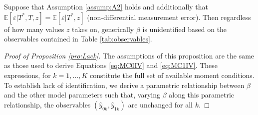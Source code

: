 \begin{pro}
  \label{pro:Lack}
  Suppose that Assumption \ref{assump:A2} holds and additionally that $\mathbb{E}[\varepsilon|T^*,T,z]=\mathbb{E}[\varepsilon|T^*,z]$ (non-differential measurement error).  
  Then regardless of how many values $z$ takes on, generically $\beta$ is unidentified based on the observables contained in Table \ref{tab:observables}.
\end{pro}
\begin{proof}[Proof of Proposition \ref{pro:Lack}]
  The assumptions of this proposition are the same as those used to derive Equations \ref{eq:MC0IV} and \ref{eq:MC1IV}. 
  These expressions, for $k = 1, \dots, K$ constitute the full set of available moment conditions.
  To establish lack of identification, we derive a parametric relationship between $\beta$ and the other model parameters such that, varying $\beta$ along this parametric relationship, the observables $(\hat{y}_{0k},\hat{y}_{1k})$ are unchanged for all $k$.   


\end{proof}
